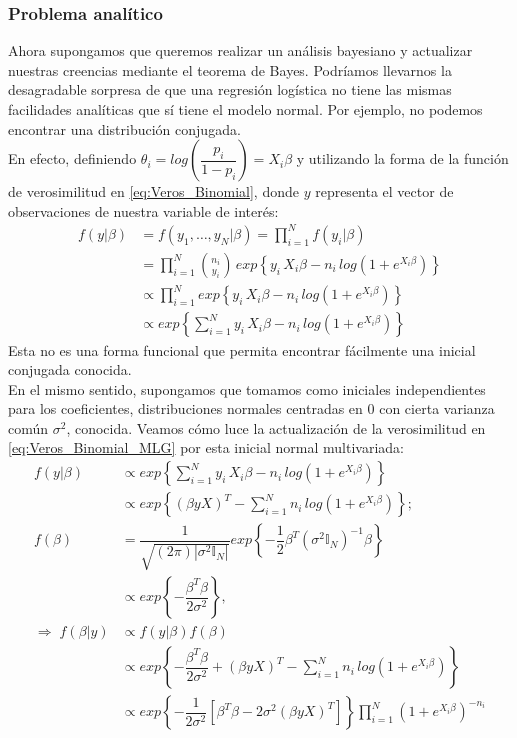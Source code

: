 \subsubsection{Problema analítico} \label{sec:Prob_Analitico}

Ahora supongamos que queremos realizar un análisis bayesiano y actualizar nuestras creencias mediante el teorema de Bayes. Podríamos llevarnos la desagradable sorpresa de que una regresión logística no tiene las mismas facilidades analíticas que sí tiene el modelo normal. Por ejemplo, no podemos encontrar una distribución conjugada.\\ 

En efecto, definiendo $\theta_i = log\left(\dfrac{p_i}{1-p_i}\right)=X_i\beta$ y utilizando la forma de la función de verosimilitud en \eqref{eq:Veros_Binomial}, donde $y$ representa el vector de observaciones de nuestra variable de interés: 
\begin{align} \label{eq:Veros_Binomial_MLG} 
f(y|\beta) &= f(y_1,\dots,y_N|\beta)= \prod_{i=1}^N f(y_i|\beta) \nonumber\\
&= \prod_{i=1}^N {n_i\choose y_i}\,exp\left\lbrace y_i\,X_i\beta-n_i\,log\left(1+e^{X_i\beta}\right)\right\rbrace \nonumber\\
&\propto \prod_{i=1}^N exp\left\lbrace y_i\,X_i\beta-n_i\,log\left(1+e^{X_i\beta}\right)\right\rbrace \nonumber\\
&\propto exp\left\lbrace \sum\limits_{i=1}^Ny_i\,X_i\beta-n_i\,log\left(1+e^{X_i\beta}\right)\right\rbrace 
\end{align}
Esta no es una forma funcional que permita encontrar fácilmente una inicial conjugada conocida.\\

En el mismo sentido, supongamos que tomamos como iniciales independientes para los coeficientes, distribuciones normales centradas en $0$ con cierta varianza común $\sigma^2$, conocida. Veamos cómo luce la actualización de la verosimilitud en \eqref{eq:Veros_Binomial_MLG} por esta inicial normal multivariada: 
\begin{align*}
f(y|\beta) &\propto exp\left\lbrace \sum\limits_{i=1}^N y_i\,X_i\beta-n_i\,log\left(1+e^{X_i\beta}\right)\right\rbrace \\
&\propto exp\left\lbrace (\beta yX)^T-\sum\limits_{i=1}^Nn_i\,log\left(1+e^{X_i\beta}\right)\right\rbrace; \\
f(\beta) &= \dfrac{1}{\sqrt{(2\pi)|\sigma^2 \mathbb{I}_N|}}exp\left\lbrace -\dfrac{1}{2}\beta^T(\sigma^2\mathbb{I}_N)^{-1}\beta\right\rbrace \\
&\propto exp\left\lbrace -\dfrac{\beta^T\beta}{2\sigma^2}\right\rbrace, \\
\Rightarrow \; f(\beta|y)&\propto f(y|\beta)f(\beta) \\
&\propto exp\left\lbrace -\dfrac{\beta^T\beta}{2\sigma^2} + (\beta yX)^T-\sum\limits_{i=1}^Nn_i\,log\left(1+e^{X_i\beta}\right)\right\rbrace \\
&\propto exp\left\lbrace -\dfrac{1}{2\sigma^2}\left[\beta^T\beta - 2\sigma^2(\beta yX)^T\right]\right\rbrace\prod_{i=1}^N \left(1+e^{X_i\beta}\right)^{-n_i}
\end{align*}

